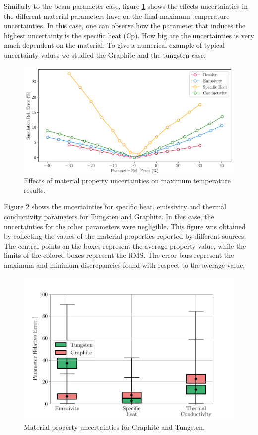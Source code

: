 Similarly to the beam parameter case, figure  \ref{fig:MatPar} shows the effects uncertainties in the different material parameters have on the final maximum temperature uncertainties. In this case, one can observe how the parameter that induces the highest uncertainty is the specific heat (Cp). How big are the uncertainties is very much dependent on the material. To give a numerical example of typical uncertainty values we studied the Graphite and the tungsten case. 

\begin{figure}[h]
    \centering
    \includegraphics[width=0.7\columnwidth]{MaterialParameterUncertainty/MatParUnc.pdf}
    \caption{Effects of material property uncertainties on maximum temperature results.}
    \label{fig:MatPar}
\end{figure}

Figure \ref{fig:MatPropUnc} shows the uncertainties for specific heat, emissivity and thermal conductivity
parameters for Tungsten and Graphite. In this case, the uncertainties for the other parameters were negligible. This figure was obtained by collecting the values of the material properties reported by different sources. The central points on the boxes represent the average property value, while the limits of the colored boxes represent the RMS. The error bars represent the maximum and minimum discrepancies found with respect to the average value. 

\begin{figure}[h]
    \centering
    \includegraphics[width=0.7\columnwidth]{PlotTungstenGraphiteUncertainty/GraphTungsUnc.pdf}
    \caption{Material property uncertainties for Graphite and Tungsten. }
    \label{fig:MatPropUnc}
\end{figure}

